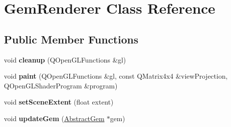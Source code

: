 \hypertarget{class_gem_renderer}{}\section{Gem\+Renderer Class Reference}
\label{class_gem_renderer}
\subsection*{Public Member Functions}
\begin{DoxyCompactItemize}
\item 
\hypertarget{class_gem_renderer_a9da8103dc08a4203727b6967337fa65b}{}void {\bfseries cleanup} (Q\+Open\+G\+L\+Functions \&gl)\label{class_gem_renderer_a9da8103dc08a4203727b6967337fa65b}

\item 
\hypertarget{class_gem_renderer_a129dc12b1b309a0d707f9c6f17a3a4e9}{}void {\bfseries paint} (Q\+Open\+G\+L\+Functions \&gl, const Q\+Matrix4x4 \&view\+Projection, Q\+Open\+G\+L\+Shader\+Program \&program)\label{class_gem_renderer_a129dc12b1b309a0d707f9c6f17a3a4e9}

\item 
\hypertarget{class_gem_renderer_afdc5555e3e82c4a021deac461fffe435}{}void {\bfseries set\+Scene\+Extent} (float extent)\label{class_gem_renderer_afdc5555e3e82c4a021deac461fffe435}

\item 
\hypertarget{class_gem_renderer_a4be8d2a7b1443262392adc828f3910c8}{}void {\bfseries update\+Gem} (\hyperlink{class_abstract_gem}{Abstract\+Gem} $\ast$gem)\label{class_gem_renderer_a4be8d2a7b1443262392adc828f3910c8}

\end{DoxyCompactItemize}

